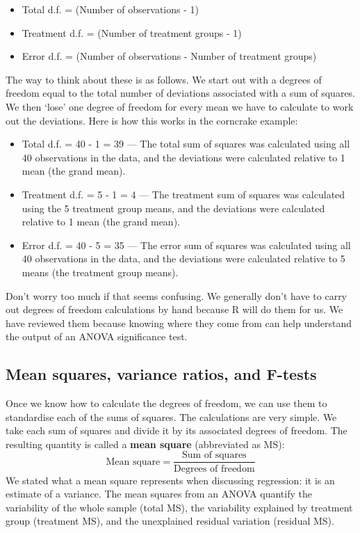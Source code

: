 \documentclass[
]{book}
\providecommand{\tightlist}{%
  \setlength{\itemsep}{0pt}\setlength{\parskip}{0pt}}
\begin{document}
\begin{itemize}
\tightlist
\item
  Total d.f. = (Number of observations - 1)
\item
  Treatment d.f. = (Number of treatment groups - 1)
\item
  Error d.f. = (Number of observations - Number of treatment groups)
\end{itemize}

The way to think about these is as follows. We start out with a degrees of freedom equal to the total number of deviations associated with a sum of squares. We then `lose' one degree of freedom for every mean we have to calculate to work out the deviations. Here is how this works in the corncrake example:

\begin{itemize}
\item
  Total d.f. = 40 - 1 = 39 --- The total sum of squares was calculated using all 40 observations in the data, and the deviations were calculated relative to 1 mean (the grand mean).
\item
  Treatment d.f. = 5 - 1 = 4 --- The treatment sum of squares was calculated using the 5 treatment group means, and the deviations were calculated relative to 1 mean (the grand mean).
\item
  Error d.f. = 40 - 5 = 35 --- The error sum of squares was calculated using all 40 observations in the data, and the deviations were calculated relative to 5 means (the treatment group means).
\end{itemize}

Don't worry too much if that seems confusing. We generally don't have to carry out degrees of freedom calculations by hand because R will do them for us. We have reviewed them because knowing where they come from can help understand the output of an ANOVA significance test.

\hypertarget{mean-squares-variance-ratios-and-f-tests}{%
\subsection{Mean squares, variance ratios, and F-tests}\label{mean-squares-variance-ratios-and-f-tests}}

Once we know how to calculate the degrees of freedom, we can use them to standardise each of the sums of squares. The calculations are very simple. We take each sum of squares and divide it by its associated degrees of freedom. The resulting quantity is called a \textbf{mean square} (abbreviated as MS): \[
\text{Mean square} = \frac{\text{Sum of squares}}{\text{Degrees of freedom}}
\] We stated what a mean square represents when discussing regression: it is an estimate of a variance. The mean squares from an ANOVA quantify the variability of the whole sample (total MS), the variability explained by treatment group (treatment MS), and the unexplained residual variation (residual MS).
\end{document}
